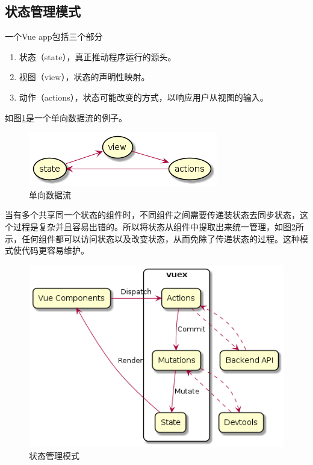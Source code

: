 \subsection{状态管理模式}

一个Vue app包括三个部分
\begin{enumerate}
  \item 状态（state），真正推动程序运行的源头。
  \item 视图（view），状态的声明性映射。
  \item 动作（actions），状态可能改变的方式，以响应用户从视图的输入。
\end{enumerate}

如图\ref{vuex-one-way-data-flow}是一个单向数据流的例子。

\begin{figure}[htbp]
  \centering
  \includegraphics[scale = 0.6]{out/uml/部署图/vuex-one-way-data-flow/vuex-one-way-data-flow.png}
  \caption{\song\wuhao 单向数据流}
  \label{vuex-one-way-data-flow}
\end{figure}

当有多个共享同一个状态的组件时，不同组件之间需要传递装状态去同步状态，这个过程是复杂并且容易出错的。所以将状态从组件中提取出来统一管理，如图\ref{vuex-state-management-pattern}所示，任何组件都可以访问状态以及改变状态，从而免除了传递状态的过程。这种模式使代码更容易维护。

\begin{figure}[htbp]
  \centering
  \includegraphics[scale = 0.5]{out/uml/部署图/vuex-state-management-pattern/vuex-state-management-pattern.png}
  \caption{\song\wuhao 状态管理模式}
  \label{vuex-state-management-pattern}
\end{figure}


